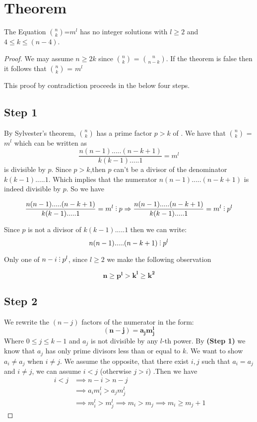 \documentclass[a4paper]{article}
\newcommand{\divby}{\ \tikz \foreach \y in {0ex, 0.65ex, 1.3ex} \fill (0,\y) circle (0.5pt);\ }
\begin{document}
\section{Theorem}
\begin{tcolorbox}
\center The Equation $n\choose k$=$m^l$ has no integer solutions with 
$l\ge2$ and $4\le k\le(n-4)$. 
\end{tcolorbox}

\begin{proof}
We may assume $n\geq 2k$ since $n\choose k$ = $n\choose n-k$. If the theorem is false then it follows that $n\choose k$ = $m^l$

This proof by contradiction proceeds in the below four steps. 
\subsection{Step 1}
By Sylvester's theorem,  ${n \choose k}$ has a prime factor $p>k$ of . We have that $n \choose k$ = $m^l$ which can be written as $$\frac{n(n-1).....(n-k+1) }{k(k-1).....1} = m^l $$   is divisible by $p$.
Since $p>k$,then $p$ can't be a divisor of the denominator $k(k-1).....1$. Which implies that the numerator $n(n-1).....(n-k+1)$ is indeed divisible by $p$. So we have

 $$ \frac {n(n-1).....(n-k+1)}{k(k-1).....1}=m^l \divby p 
 \Rightarrow \frac {n(n-1).....(n-k+1)}{k(k-1).....1}=m^l \divby p^l $$

Since  $p$ is not a divisor of $k(k-1).....1$ then we can write: 
 $$ n(n-1).....(n-k+1)\divby p^l $$

Only one of $ n-i \divby p^{l}$, since $l \geq 2$ we make the following observation

\begin{equation}
\boldsymbol {n\geq p^l > k^l \ge k^2}       
\end{equation}


\subsection{Step 2}
We rewrite the $(n-j)$ factors of the numerator in the form:
\begin{equation}
\boldsymbol {(n-j)= a_j m_j^l} 
\end{equation}
Where $ 0 \leq j \leq k-1$ and  $a_j$ is not divisible by any $l$-th power. By \textbf{(Step 1)} we know that $a_j$ has only prime divisors less than or equal to $k$. 
We want to show $a_i \neq a_j$ when $i \neq j$. We assume the opposite, that there exist  $ i, j$  such that $a_i = a_j$ and $i \neq j$, we can assume $i<j$ (otherwise $j>i$) .Then we have
\begin{align*}
\  i<j &\implies n-i > n-j  \\
 &\implies a_i m_i^l > a_j m_j^l      \\
 &\implies m_i^l > m_j^l \implies m_i > m_j \implies m_i \geq m_j+1
\end{align*}



\end{proof}
\end{document}
